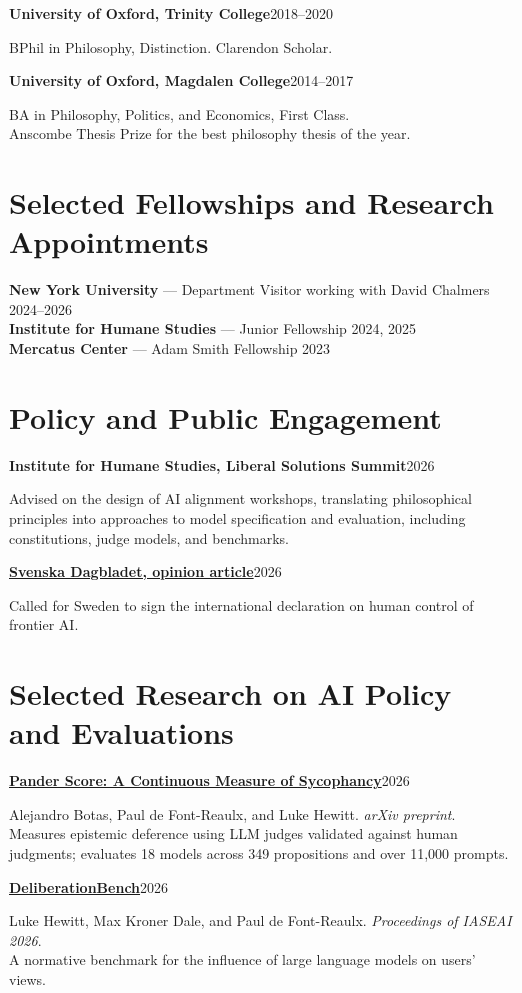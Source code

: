 \documentclass[11pt,letterpaper]{article}
\newcommand{\entry}[2]{\textbf{#1}\hfill #2\par}
\begin{document}
\entry{University of Oxford, Trinity College}{2018--2020}
BPhil in Philosophy, Distinction. Clarendon Scholar.

\entry{University of Oxford, Magdalen College}{2014--2017}
BA in Philosophy, Politics, and Economics, First Class.\\
Anscombe Thesis Prize for the best philosophy thesis of the year.

\section{Selected Fellowships and Research Appointments}
\textbf{New York University} --- Department Visitor working with David Chalmers \hfill 2024--2026\\
\textbf{Institute for Humane Studies} --- Junior Fellowship \hfill 2024, 2025\\
\textbf{Mercatus Center} --- Adam Smith Fellowship \hfill 2023

\section{Policy and Public Engagement}
\entry{Institute for Humane Studies, Liberal Solutions Summit}{2026}
Advised on the design of AI alignment workshops, translating philosophical principles into approaches to model specification and evaluation, including constitutions, judge models, and benchmarks.

\entry{\href{https://www.svd.se/a/OkKKWV/sverige-bor-skriva-under-det-internationella-ai-uppropet-skriver-paul-de-font-reaulx}{Svenska Dagbladet, opinion article}}{2026}
Called for Sweden to sign the international declaration on human control of frontier AI.


\newpage
\section{Selected Research on AI Policy and Evaluations}
\entry{\href{https://arxiv.org/abs/2606.07897}{Pander Score: A Continuous Measure of Sycophancy}}{2026}
Alejandro Botas, Paul de Font-Reaulx, and Luke Hewitt. \textit{arXiv preprint}.\\
Measures epistemic deference using LLM judges validated against human judgments; evaluates 18 models across 349 propositions and over 11,000 prompts.

\entry{\href{https://arxiv.org/abs/2603.10018}{DeliberationBench}}{2026}
Luke Hewitt, Max Kroner Dale, and Paul de Font-Reaulx. \textit{Proceedings of IASEAI 2026}.\\
A normative benchmark for the influence of large language models on users' views.
\end{document}
